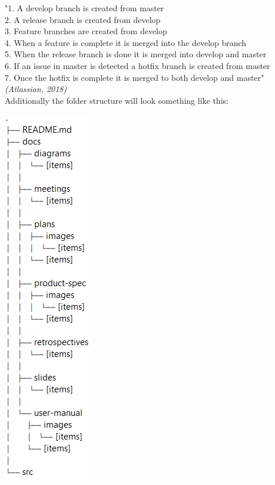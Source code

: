 \documentclass[12pt]{article}%
\begin{document}
\noindent
"1. A develop branch is created from master \\
2. A release branch is created from develop \\
3. Feature branches are created from develop \\
4. When a feature is complete it is merged into the develop branch \\
5. When the release branch is done it is merged into develop and master \\
6. If an issue in master is detected a hotfix branch is created from master \\
7. Once the hotfix is complete it is merged to both develop and master" \\
\textit{(Atlassian, 2018)} \\

\vspace{50mm}
\noindent
Additionally the folder structure will look something like this: \\ \\
\includegraphics[scale=1]{structure.png}
\vspace{50mm}
\end{document}
